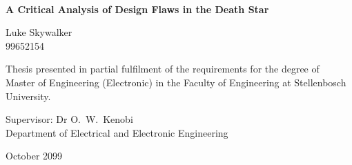 \graphicspath{{frontmatter/fig/}}

\begin{titlepage}
	\begin{center}
		
		
		
		~\vspace{4.5em}
		
		{\sffamily \bfseries \huge A Critical Analysis of Design Flaws in the Death Star \par}
		
		\vspace{7em}
		
		{\large {\Large  Luke Skywalker} \\ 99652154 \par}
		
		\vspace{8em}
		
		{\large Thesis presented in partial fulfilment of the requirements for the degree of \\ Master of Engineering (Electronic) in the Faculty of Engineering at Stellenbosch University. \par}
		
		\vfill
		
		{\large {Supervisor}: Dr O.\ W.\ Kenobi\\
		Department of Electrical and Electronic Engineering \par}
		
		\vspace{10em}
		
		{\Large October 2099}
	\end{center}
\end{titlepage}
